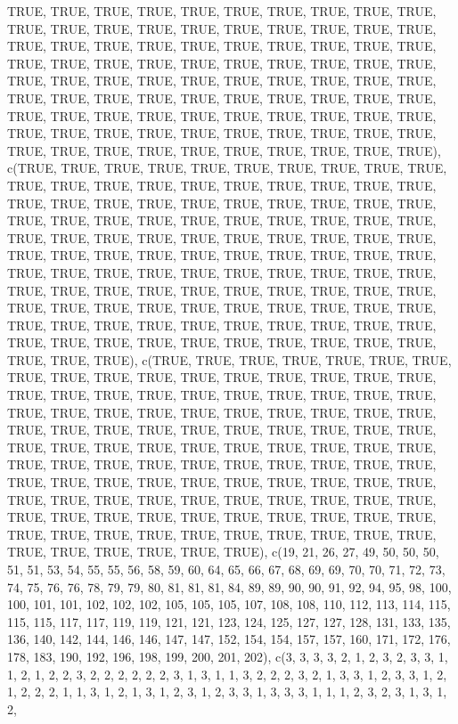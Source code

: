 \documentclass[
  letterpaper,
  DIV=11,
  numbers=noendperiod]{scrartcl}
\begin{document}
TRUE, TRUE, TRUE, TRUE, TRUE, TRUE, TRUE, TRUE, TRUE, TRUE, TRUE, TRUE,
TRUE, TRUE, TRUE, TRUE, TRUE, TRUE, TRUE, TRUE, TRUE, TRUE, TRUE, TRUE,
TRUE, TRUE, TRUE, TRUE, TRUE, TRUE, TRUE, TRUE, TRUE, TRUE, TRUE, TRUE,
TRUE, TRUE, TRUE, TRUE, TRUE, TRUE, TRUE, TRUE, TRUE, TRUE, TRUE, TRUE,
TRUE, TRUE, TRUE, TRUE, TRUE, TRUE, TRUE, TRUE, TRUE, TRUE, TRUE, TRUE,
TRUE, TRUE, TRUE, TRUE, TRUE, TRUE, TRUE, TRUE, TRUE, TRUE, TRUE, TRUE,
TRUE, TRUE, TRUE, TRUE, TRUE, TRUE, TRUE, TRUE, TRUE, TRUE, TRUE, TRUE,
TRUE, TRUE, TRUE, TRUE, TRUE, TRUE), c(TRUE, TRUE, TRUE, TRUE, TRUE,
TRUE, TRUE, TRUE, TRUE, TRUE, TRUE, TRUE, TRUE, TRUE, TRUE, TRUE, TRUE,
TRUE, TRUE, TRUE, TRUE, TRUE, TRUE, TRUE, TRUE, TRUE, TRUE, TRUE, TRUE,
TRUE, TRUE, TRUE, TRUE, TRUE, TRUE, TRUE, TRUE, TRUE, TRUE, TRUE, TRUE,
TRUE, TRUE, TRUE, TRUE, TRUE, TRUE, TRUE, TRUE, TRUE, TRUE, TRUE, TRUE,
TRUE, TRUE, TRUE, TRUE, TRUE, TRUE, TRUE, TRUE, TRUE, TRUE, TRUE, TRUE,
TRUE, TRUE, TRUE, TRUE, TRUE, TRUE, TRUE, TRUE, TRUE, TRUE, TRUE, TRUE,
TRUE, TRUE, TRUE, TRUE, TRUE, TRUE, TRUE, TRUE, TRUE, TRUE, TRUE, TRUE,
TRUE, TRUE, TRUE, TRUE, TRUE, TRUE, TRUE, TRUE, TRUE, TRUE, TRUE, TRUE,
TRUE, TRUE, TRUE, TRUE, TRUE, TRUE, TRUE, TRUE, TRUE, TRUE, TRUE, TRUE),
c(TRUE, TRUE, TRUE, TRUE, TRUE, TRUE, TRUE, TRUE, TRUE, TRUE, TRUE,
TRUE, TRUE, TRUE, TRUE, TRUE, TRUE, TRUE, TRUE, TRUE, TRUE, TRUE, TRUE,
TRUE, TRUE, TRUE, TRUE, TRUE, TRUE, TRUE, TRUE, TRUE, TRUE, TRUE, TRUE,
TRUE, TRUE, TRUE, TRUE, TRUE, TRUE, TRUE, TRUE, TRUE, TRUE, TRUE, TRUE,
TRUE, TRUE, TRUE, TRUE, TRUE, TRUE, TRUE, TRUE, TRUE, TRUE, TRUE, TRUE,
TRUE, TRUE, TRUE, TRUE, TRUE, TRUE, TRUE, TRUE, TRUE, TRUE, TRUE, TRUE,
TRUE, TRUE, TRUE, TRUE, TRUE, TRUE, TRUE, TRUE, TRUE, TRUE, TRUE, TRUE,
TRUE, TRUE, TRUE, TRUE, TRUE, TRUE, TRUE, TRUE, TRUE, TRUE, TRUE, TRUE,
TRUE, TRUE, TRUE, TRUE, TRUE, TRUE, TRUE, TRUE, TRUE, TRUE, TRUE, TRUE,
TRUE, TRUE, TRUE, TRUE, TRUE, TRUE), c(19, 21, 26, 27, 49, 50, 50, 50,
51, 51, 53, 54, 55, 55, 56, 58, 59, 60, 64, 65, 66, 67, 68, 69, 69, 70,
70, 71, 72, 73, 74, 75, 76, 76, 78, 79, 79, 80, 81, 81, 81, 84, 89, 89,
90, 90, 91, 92, 94, 95, 98, 100, 100, 101, 101, 102, 102, 102, 105, 105,
105, 107, 108, 108, 110, 112, 113, 114, 115, 115, 115, 117, 117, 119,
119, 121, 121, 123, 124, 125, 127, 127, 128, 131, 133, 135, 136, 140,
142, 144, 146, 146, 147, 147, 152, 154, 154, 157, 157, 160, 171, 172,
176, 178, 183, 190, 192, 196, 198, 199, 200, 201, 202), c(3, 3, 3, 3, 2,
1, 2, 3, 2, 3, 3, 1, 1, 2, 1, 2, 2, 3, 2, 2, 2, 2, 2, 2, 3, 1, 3, 1, 1,
3, 2, 2, 2, 3, 2, 1, 3, 3, 1, 2, 3, 3, 1, 2, 1, 2, 2, 2, 1, 1, 3, 1, 2,
1, 3, 1, 2, 3, 1, 2, 3, 3, 1, 3, 3, 3, 1, 1, 1, 2, 3, 2, 3, 1, 3, 1, 2,
\end{document}
